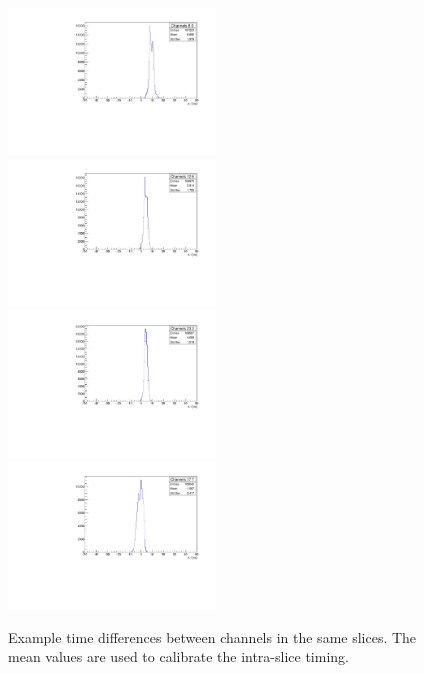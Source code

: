 \documentclass[12pt]{article}
\begin{document}
\begin{figure}
    \centering
    \includegraphics[width=0.49\textwidth]{figures/timingPlots/intraSlice/Channels_8_0.pdf}~
    \includegraphics[width=0.49\textwidth]{figures/timingPlots/intraSlice/Channels_12_6.pdf}\\
    \includegraphics[width=0.49\textwidth]{figures/timingPlots/intraSlice/Channels_23_3.pdf}~
    \includegraphics[width=0.49\textwidth]{figures/timingPlots/intraSlice/Channels_17_7.pdf}
    \caption{\label{fig:timeDiffIntraSlice} Example time differences between channels in the same slices. The mean values are used to calibrate the intra-slice timing.}
\end{figure}
\end{document}
